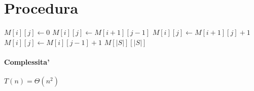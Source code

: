 \newpage

\section{Procedura}

\begin{algorithm}
    \begin{algorithmic}
                        \State $M[i][j] \gets 0$
                        \State $M[i][j] \gets M[i+1][j-1]$
                            \State $M[i][j] \gets M[i+1][j] + 1$
                        \Else
                            \State $M[i][j] \gets M[i][j-1] + 1$
                        \EndIf
                    \EndIf
                \EndFor
            \EndFor
            \State \Return $M[|S|][|S|]$
        \EndProcedure
    \end{algorithmic}
\end{algorithm}

\paragraph{Complessita'}

$T(n) = \Theta(n^2)$
